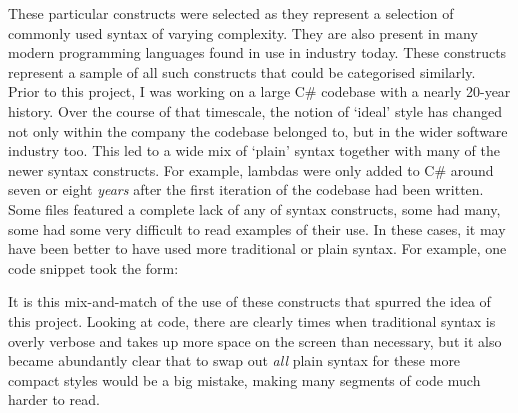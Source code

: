 \documentclass{article}
\begin{document}
        These particular constructs were selected as they represent a selection of commonly used syntax of varying complexity. They are also present in many modern programming languages found in use in industry today. These constructs represent a sample of all such constructs that could be categorised similarly.
        \\
        Prior to this project, I was working on a large C\# codebase with a nearly 20-year history. Over the course of that timescale, the notion of `ideal' style has changed not only within the company the codebase belonged to, but in the wider software industry too. This led to a wide mix of `plain' syntax together with many of the newer syntax constructs. For example, lambdas were only added to C\# around seven or eight \emph{years} after the first iteration of the codebase had been written. Some files featured a complete lack of any of syntax constructs, some had many, some had some very difficult to read examples of their use. In these cases, it may have been better to have used more traditional or plain syntax. For example, one code snippet took the form:\newline

        \newline
        \indent\indent{}\newline
        \indent\indent{}\newline
        \indent\indent{}\newline
        

        It is this mix-and-match of the use of these constructs that spurred the idea of this project. Looking at code, there are clearly times when traditional syntax is overly verbose and takes up more space on the screen than necessary, but it also became abundantly clear that to swap out \emph{all} plain syntax for these more compact styles would be a big mistake, making many segments of code much harder to read.
\end{document}
